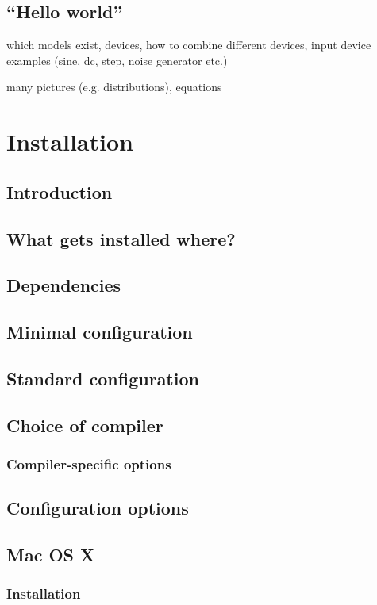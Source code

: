 \documentclass[a4paper,10pt]{report}
\begin{document}
\section{``Hello world''}

which models exist, devices, how to combine different devices, input device
examples (sine, dc, step, noise generator etc.)

many pictures (e.g. distributions), equations

\chapter{Installation}
\section{Introduction}
\section{What gets installed where?}
\section{Dependencies}
\section{Minimal configuration}
\section{Standard configuration}
\section{Choice of compiler}
\subsection{Compiler-specific options}
\section{Configuration options}
\section{Mac OS X}
\subsection{Installation}
\end{document}
